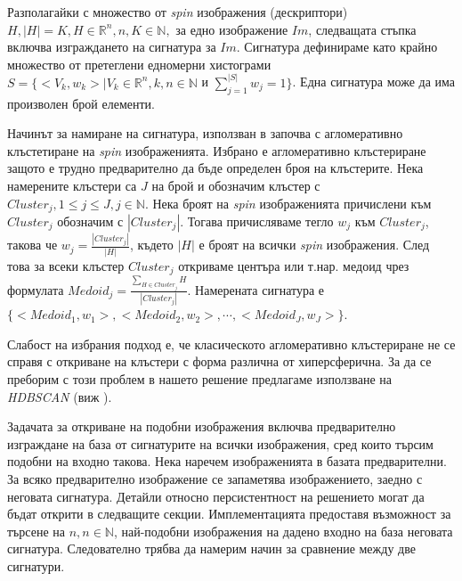 \documentclass[a4paper,12pt]{article}
\begin{document}
\bigbreak

Разполагайки с множество от \textit{spin} изображения (дескриптори) $H, |H|=K, H \in \mathbb{R}^n, n, K \in \mathbb{N},$ за едно изображение $Im$, следващата стъпка включва изграждането на сигнатура за $Im$. Сигнатура дефинираме като крайно множество от претеглени едномерни хистограми $S = \{<V_k, w_k> | V_k \in \mathbb{R}^n, k,n \in \mathbb{N} $ и $\sum_{j=1}^{|S|} w_j = 1 \}$. Една сигнатура може да има произволен брой елементи.

\bigbreak

Начинът за намиране на сигнатура, използван в \cite{spinimages} започва с агломеративно клъстетиране на \textit{spin} изображенията. Избрано е агломеративно клъстериране защото е трудно предварително да бъде определен броя на клъстерите. Нека намерените клъстери са $J$ на брой и обозначим клъстер с $Cluster_j, 1 \leq j \leq J, j \in \mathbb{N}$. Нека броят на \textit{spin} изображенията причислени към $Cluster_j$ обозначим с $|Cluster_j|$. Тогава причисляваме тегло $w_j$ към $Cluster_j$, такова че $w_j = \frac{|Cluster_j|}{|H|}$, където $|H|$ е броят на всички \textit{spin} изображения. След това за всеки клъстер $Cluster_j$ откриваме центъра или т.нар. медоид чрез формулата $Medoid_j = \frac{\sum_{H \in Cluster_j} H}{|Cluster_j|}$. Намерената сигнатура е $\{<Medoid_1, w_1>, <Medoid_2, w_2>, \cdots, <Medoid_J, w_J>\}$.

\bigbreak

Слабост на избрания подход е, че класическото агломеративно клъстериране не се справя с откриване на клъстери с форма различна от хиперсферична. За да се преборим с този проблем в нашето решение предлагаме използване на \textit{HDBSCAN} (виж \cite{hdbscan}).

\bigbreak

Задачата за откриване на подобни изображения включва предварително изграждане на база от сигнатурите на всички изображения, сред които търсим подобни на входно такова. Нека наречем изображенията в базата предварителни. За всяко предварително изображение се запаметява изображението, заедно с неговата сигнатура. Детайли относно персистентност на решението могат да бъдат открити в следващите секции. Имплементацията предоставя възможност за търсене на $n, n \in \mathbb{N}$, най-подобни изображения на дадено входно на база неговата сигнатура. Следователно трябва да намерим начин за сравнение между две сигнатури.

\bigbreak
\end{document}
